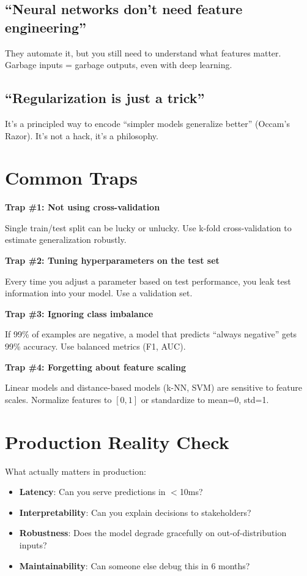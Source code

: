 \subsection{``Neural networks don't need feature engineering''}
They automate it, but you still need to understand what features matter. Garbage inputs = garbage outputs, even with deep learning.

\subsection{``Regularization is just a trick''}
It's a principled way to encode ``simpler models generalize better'' (Occam's Razor). It's not a hack, it's a philosophy.

\section{Common Traps}

\textbf{Trap \#1: Not using cross-validation}

Single train/test split can be lucky or unlucky. Use k-fold cross-validation to estimate generalization robustly.

\textbf{Trap \#2: Tuning hyperparameters on the test set}

Every time you adjust a parameter based on test performance, you leak test information into your model. Use a validation set.

\textbf{Trap \#3: Ignoring class imbalance}

If 99\% of examples are negative, a model that predicts ``always negative'' gets 99\% accuracy. Use balanced metrics (F1, AUC).

\textbf{Trap \#4: Forgetting about feature scaling}

Linear models and distance-based models (k-NN, SVM) are sensitive to feature scales. Normalize features to $[0,1]$ or standardize to mean=0, std=1.

\section{Production Reality Check}

What actually matters in production:

\begin{itemize}
    \item \textbf{Latency}: Can you serve predictions in $<$10ms?
    \item \textbf{Interpretability}: Can you explain decisions to stakeholders?
    \item \textbf{Robustness}: Does the model degrade gracefully on out-of-distribution inputs?
    \item \textbf{Maintainability}: Can someone else debug this in 6 months?
\end{itemize}

